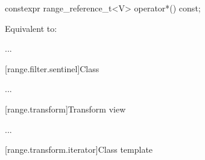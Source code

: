 \documentclass{wg21}
\begin{document}
%
\begin{itemdecl}
constexpr range_reference_t<V> operator*() const;
\end{itemdecl}

\begin{itemdescr}
\pnum
\effects Equivalent to: 
\end{itemdescr}

...

[range.filter.sentinel]{Class }

...


[range.transform]{Transform view}

...

[range.transform.iterator]{Class template }
\end{document}
